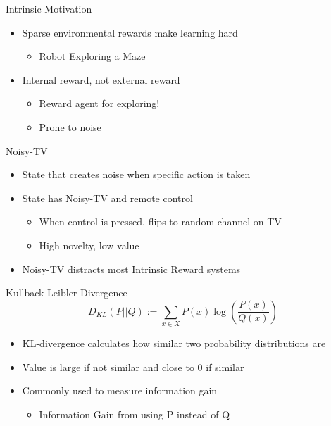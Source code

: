 	
	\begin{frame}[fragile]{Intrinsic Motivation}
		\begin{itemize}
			\item {Sparse environmental rewards make learning hard}
			\begin{itemize}
				\item {Robot Exploring a Maze}
			\end{itemize}
			\item {Internal reward, not external reward}
			\begin{itemize}
				\item {Reward agent for exploring!}
				\item {Prone to noise}
			\end{itemize}
		\end{itemize}
	\end{frame}
	
	
	\begin{frame}[fragile]{Noisy-TV}
		\begin{itemize}
			\item {State that creates noise when specific action is taken}
			\item {State has Noisy-TV and remote control}
			\begin{itemize}
				\item {When control is pressed, flips to random channel on TV}
				\item {High novelty, low value}
			\end{itemize}
			\item {Noisy-TV distracts most Intrinsic Reward systems}
		\end{itemize}
	\end{frame}
	
	
	\begin{frame}[fragile]{Kullback-Leibler Divergence}
		\[D_{KL} (P || Q) := \sum_{x \in X} P(x) \log(\frac{P(x)}{Q(x)})\]
		
		\begin{itemize}
			\item {KL-divergence calculates how similar two probability distributions are}
			\item {Value is large if not similar and close to 0 if similar}
			\item {Commonly used to measure information gain}
			\begin{itemize}
				\item {Information Gain from using P instead of Q}
			\end{itemize}
		\end{itemize}
	\end{frame}
	
